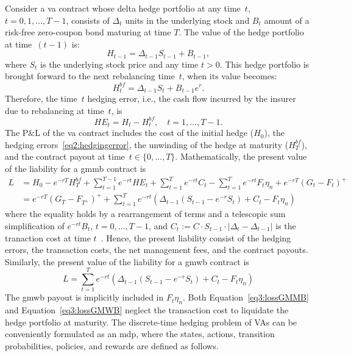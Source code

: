 Consider a \gls{va} contract whose delta hedge portfolio at any time~$t$, $t=0,1,\ldots,T-1$, consists of $\Delta_t$ units in the underlying stock and $B_t$ amount of a risk-free zero-coupon bond maturing at time $T$.
The value of the hedge portfolio at time~$(t-1)$ is:
\begin{equation*}
    H_{t-1} = \Delta_{t-1} S_{t-1} + B_{t-1},
\end{equation*}
where $S_t$ is the underlying stock price and any time $t>0$.
This hedge portfolio is brought forward to the next rebalancing time~$t$, when its value becomes:
\begin{equation*}
    H_{t}^{bf} = \Delta_{t-1} S_{t} + B_{t-1}e^{r}.
\end{equation*}
Therefore, the time~$t$ hedging error, i.e., the cash flow incurred by the insurer due to rebalancing at time~$t$, is
\begin{equation}
    HE_t = H_t - H^{bf}_t, \quad t=1,\ldots, T-1.
\end{equation}
The P\&L of the \gls{va} contract includes the cost of the initial hedge ($H_0$), the hedging errors~\eqref{eq2:hedgingerror}, the unwinding of the hedge at maturity ($H^{bf}_T$), and the contract payout at time~$t\in \{0,\ldots,T\}$.
Mathematically, the present value of the liability for a \gls{gmmb} contract is 
\begin{align} \label{eq3:lossGMMB}
L   & = H_0 - e^{-rT} H^{bf}_T + \sum_{t=1}^{T-1} e^{-rt} HE_t + \sum_{t=1}^T e^{-rt} C_t - \sum_{t=1}^T e^{-rt} F_t\eta_n + e^{-rT} (G_t - F_t)^+  \nonumber \\ 
    & = e^{-rT} (G_T - F_{T^+})^+ + \sum_{t=1}^T e^{-rt}  \left( \Delta_{t-1} (S_{t-1} - e^{-r} S_t) + C_t - F_t\eta_n \right) 
\end{align}
where the equality holds by a rearrangement of terms and a telescopic sum simplification of $e^{-rt}B_t$, $t=0,\ldots,T-1$, and $C_t := C \cdot S_{t-1} \cdot |\Delta_t - \Delta_{t-1}|$ is the tranaction cost at time $t$~\citep{garleanu2013dynamic}.
Hence, the present liability consist of the hedging errors, the transaction costs, the net management fees, and the contract payouts.
Similarly, the present value of the liability for a \gls{gmwb} contract is
\begin{equation} \label{eq3:lossGMWB}
L = \sum_{t=1}^T e^{-rt}  \left( \Delta_{t-1} (S_{t-1} - e^{-r} S_t) + C_t - F_t\eta_n \right)
\end{equation}
The \gls{gmwb} payout is implicitly included in $F_t\eta_n$.
Both Equation~\eqref{eq3:lossGMMB} and Equation~\eqref{eq3:lossGMWB} neglect the transaction cost to liquidate the hedge portfolio at maturity.
The discrete-time hedging problem of VAs can be conveniently formulated as an \gls{mdp}, where the states, actions, transition probabilities, policies, and rewards are defined as follows.

